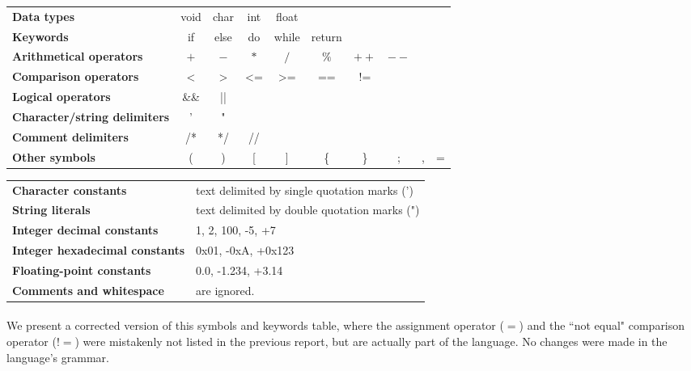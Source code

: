 \documentclass[12pt]{article}
\begin{document}
\begin{tabular}{lccccccccc}
\textbf{Data types}                      & void & char & int & float &         &      &      &   &   \\
\textbf{Keywords}                        & if   & else & do  & while & return  &      &      &   &   \\
\textbf{Arithmetical operators}          & $+$  & $-$  & $*$ & $/$   & $\%$    & $++$ & $--$ &   &   \\
\textbf{Comparison operators}            & <    & >    & <=  & >=    & ==      & !=   &      &   &   \\
\textbf{Logical operators}               & \&\& & ||   &     &       &         &      &      &   &   \\
\textbf{Character/string delimiters}     & '    & "    &     &       &         &      &      &   &   \\
\textbf{Comment delimiters}              & /*   & */   & //  &       &         &      &      &   &   \\
\textbf{Other symbols}                   & (    & )    & [   & ]     & \{      & \}   & ;    & , & = \\
\end{tabular}

\vspace*{1cm}

\begin{tabular}{ll}
\textbf{Character constants}            & text delimited by single quotation marks (') \\
\textbf{String literals}                & text delimited by double quotation marks (") \\
\textbf{Integer decimal constants}      & 1, 2, 100, -5, +7                            \\
\textbf{Integer hexadecimal constants}  & 0x01, -0xA, +0x123                           \\
\textbf{Floating-point constants}       & 0.0, -1.234, +3.14                           \\
\textbf{Comments and whitespace}        & are ignored.                                 \\
\end{tabular}

\paragraph{}
We present a corrected version of this symbols and keywords table, where the assignment operator
($=$) and the ``not equal" comparison operator ($!=$) were mistakenly not listed in the previous report,
but are actually part of the language. No changes were made in the language's grammar.
\end{document}
